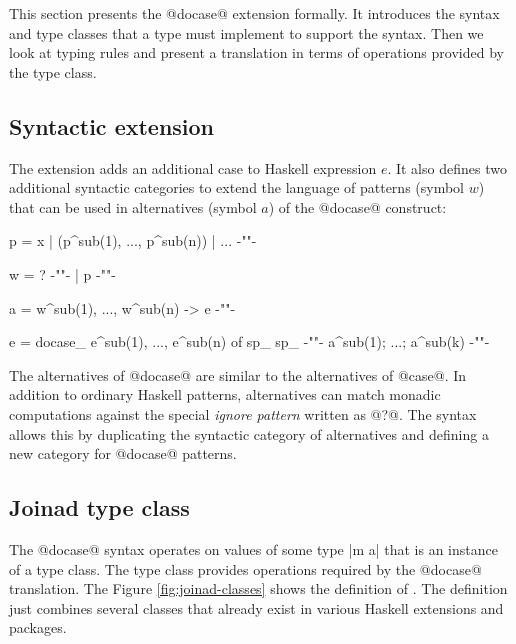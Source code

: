 \documentclass[preprint]{sigplanconf}
\begin{document}
This section presents the @docase@ extension formally. It introduces the syntax and type classes
that a type must implement to support the syntax. Then we look at typing rules and present a 
translation in terms of operations provided by the  type class.


\subsection{Syntactic extension}
\label{sec:extension-syntax}

The extension adds an additional case to Haskell expression $e$. It also 
defines two additional syntactic categories to extend the language of patterns (symbol $w$) that 
can be used in alternatives (symbol $a$) of the @docase@ construct:

\begin{code}
p  =  x | (p^sub(1), ..., p^sub(n)) | ...          {-""-}

w  =  ?                                            {-""-}
   |  p                                            {-""-}

a  =  w^sub(1), ..., w^sub(n) -> e                 {-""-}

e  =  docase_ e^sub(1), ..., e^sub(n) of  sp_ sp_  {-""-}
        a^sub(1); ...; a^sub(k)                    {-""-}
\end{code}
The alternatives of @docase@ are similar to the alternatives of @case@. In addition to ordinary 
Haskell patterns, alternatives can match monadic computations against the special 
\textit{ignore pattern} written as @?@. The syntax allows this by duplicating the syntactic
category of alternatives and defining a new category for @docase@ patterns.


\subsection{Joinad type class}
\label{sec:extension-typeclass}

The @docase@ syntax operates on values of some type |m a| that is an instance of a  
type class. The type class provides operations required by the @docase@ translation. The Figure 
\ref{fig:joinad-classes} shows the definition of . The definition just combines several 
classes that already exist in various Haskell extensions and packages. 
\end{document}
